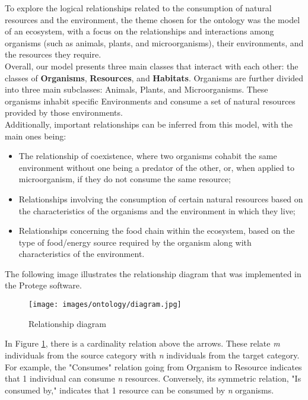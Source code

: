 

To explore the logical relationships related to the consumption of natural resources and the environment, the theme chosen for the ontology was the model of an ecosystem, with a focus on the relationships and interactions among organisms (such as animals, plants, and microorganisms), their environments, and the resources they require.
\\

Overall, our model presents three main classes that interact with each other: the classes of \textbf{Organisms}, \textbf{Resources}, and \textbf{Habitats}. Organisms are further divided into three main subclasses: Animals, Plants, and Microorganisms. These organisms inhabit specific Environments and consume a set of natural resources provided by those environments.
\\

Additionally, important relationships can be inferred from this model, with the main ones being:


\begin{itemize}
    \item The relationship of coexistence, where two organisms cohabit the same environment without one being a predator of the other, or, when applied to microorganism, if they do not consume the same resource;

    \item Relationships involving the consumption of certain natural resources based on the characteristics of the organisms and the environment in which they live;

    \item Relationships concerning the food chain within the ecosystem, based on the type of food/energy source required by the organism along with characteristics of the environment.
    \\
\end{itemize}


The following image illustrates the relationship diagram that was implemented in the Protege software.

\begin{figure}[H]
    \centering
    \texttt{[image: images/ontology/diagram.jpg]}
    \caption{Relationship diagram}
    \label{fig:diagram}
\end{figure}

In Figure \ref{fig:diagram}, there is a cardinality relation above the arrows. These relate \textit{m} individuals from the source category with \textit{n} individuals from the target category. For example, the "Consumes" relation going from Organism to Resource indicates that 1 individual can consume \textit{n} resources. Conversely, its symmetric relation, "Is consumed by," indicates that 1 resource can be consumed by \textit{n} organisms.